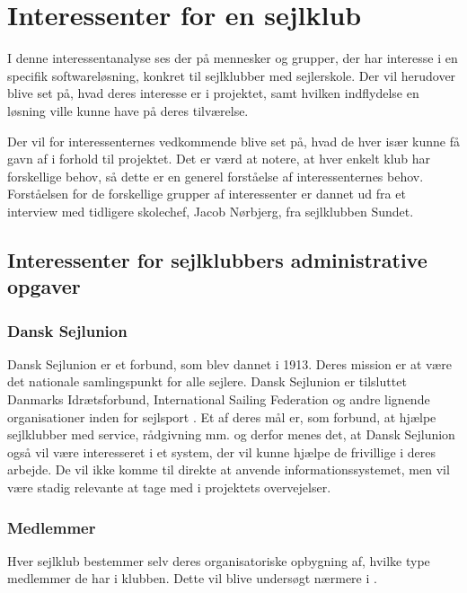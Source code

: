 \chapter{Interessenter for en sejlklub}\label{chap:interessent-analyse-ved-sejlklubber}

I denne interessentanalyse ses der på mennesker og grupper, der har interesse i en specifik softwareløsning,
konkret til sejlklubber med sejlerskole. Der vil herudover blive set på, hvad deres interesse er i projektet,
samt hvilken indflydelse en løsning ville kunne have på deres tilværelse.

Der vil for interessenternes vedkommende blive set på, hvad de hver især kunne få gavn af i forhold til
projektet. Det er værd at notere, at hver enkelt klub har forskellige behov, så dette er en generel forståelse
af interessenternes behov. Forståelsen for de forskellige grupper af interessenter er dannet ud fra et
interview med tidligere skolechef, Jacob Nørbjerg, fra sejlklubben Sundet.


\section{Interessenter for sejlklubbers administrative opgaver}


\subsection{Dansk Sejlunion}

Dansk Sejlunion er et forbund, som blev dannet i 1913. Deres mission er at være det nationale samlingspunkt for alle sejlere. 
Dansk Sejlunion er tilsluttet Danmarks Idrætsforbund, International Sailing Federation og andre lignende
organisationer inden for sejlsport \citep{Sejlsportdk}.
Et af deres mål er, som forbund, at hjælpe sejlklubber med service, rådgivning mm. og derfor menes det, at Dansk
Sejlunion også vil være interesseret i et system, der vil kunne hjælpe de frivillige i deres arbejde. 
De vil ikke komme til direkte at anvende informationssystemet, men vil være stadig relevante at tage med i projektets overvejelser.


\subsection{Medlemmer}

Hver sejlklub bestemmer selv deres organisatoriske opbygning af, hvilke type medlemmer de har i klubben.
Dette vil blive undersøgt nærmere i . 

